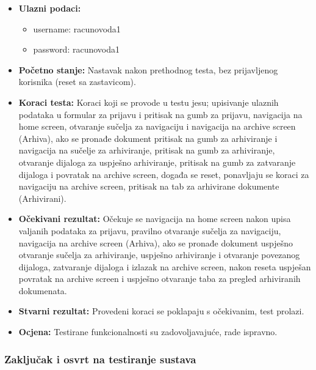 			\begin{itemize}
				
				\item{\textbf{Ulazni podaci:}}
				\begin{itemize}
					\item{username: racunovoda1}
					\item{password: racunovoda1}
				\end{itemize}
				
				\item{\textbf{Početno stanje:} Nastavak nakon prethodnog testa, bez prijavljenog korisnika (reset sa zastavicom).}
				
				\item{\textbf{Koraci testa:} Koraci koji se provode u testu jesu; upisivanje ulaznih podataka u formular za prijavu i pritisak na gumb za prijavu, navigacija na home screen, otvaranje sučelja za navigaciju i navigacija na archive screen (Arhiva), ako se pronađe dokument pritisak na gumb za arhiviranje i navigacija na sučelje za arhiviranje, pritisak na gumb za arhiviranje, otvaranje dijaloga za uspješno arhiviranje, pritisak na gumb za zatvaranje dijaloga i povratak na archive screen, događa se reset, ponavljaju se koraci za navigaciju na archive screen, pritisak na tab za arhivirane dokumente (Arhivirani).}
				
				\item{\textbf{Očekivani rezultat:} Očekuje se navigacija na home screen nakon upisa valjanih podataka za prijavu, pravilno otvaranje sučelja za navigaciju, navigacija na archive screen (Arhiva), ako se pronađe dokument uspješno otvaranje sučelja za arhiviranje, uspješno arhiviranje i otvaranje povezanog dijaloga, zatvaranje dijaloga i izlazak na archive screen, nakon reseta uspješan povratak na archive screen i uspješno otvaranje taba za pregled arhiviranih dokumenata.}
				
				\item{\textbf{Stvarni rezultat:} Provedeni koraci se poklapaju s očekivanim, test prolazi.}
				
				\item{\textbf{Ocjena:} Testirane funkcionalnosti su zadovoljavajuće, rade ispravno.}
				
			\end{itemize}
			
			\subsubsection{Zaključak i osvrt na testiranje sustava}
			
